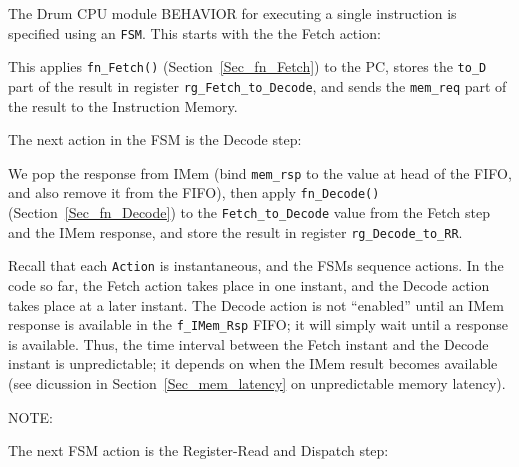 The Drum CPU module BEHAVIOR for executing a single instruction is
specified using an \verb|FSM|.  This starts with the the Fetch action:



This applies \verb|fn_Fetch()| (Section~\ref{Sec_fn_Fetch}) to the PC,
stores the \verb|to_D| part of the result in register
\verb|rg_Fetch_to_Decode|, and sends the \verb|mem_req| part of the
result to the Instruction Memory.

The next action in the FSM is the Decode step:



We pop the response from IMem (bind \verb|mem_rsp| to the value at
head of the FIFO, and also remove it from the FIFO), then apply
\verb|fn_Decode()| (Section~\ref{Sec_fn_Decode}) to the
\verb|Fetch_to_Decode| value from the Fetch step and the IMem
response, and store the result in register \verb|rg_Decode_to_RR|.

Recall that each \verb|Action| is instantaneous, and the FSMs sequence
actions.  In the code so far, the Fetch action takes place in one
instant, and the Decode action takes place at a later instant. The
Decode action is not ``enabled'' until an IMem response is available
in the \verb|f_IMem_Rsp| FIFO; it will simply wait until a response is
available.  Thus, the time interval between the Fetch instant and the
Decode instant is unpredictable; it depends on when the IMem result
becomes available (see dicussion in Section~\ref{Sec_mem_latency} on
unpredictable memory latency).

\vspace{2ex}

NOTE:

The next FSM action is the Register-Read and Dispatch step:

